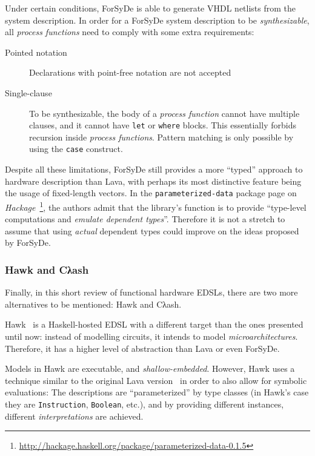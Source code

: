             Under certain conditions, ForSyDe is able to generate \ac{VHDL} netlists from the system description.
            In order for a ForSyDe system description to be \emph{synthesizable},
            all \emph{process functions} need to comply with some extra requirements:

            \begin{description}
                \item[Pointed notation] Declarations with point-free notation are not accepted
                \item[Single-clause] To be synthesizable,
                    the body of a \emph{process function} cannot have multiple clauses,
                    and it cannot have \texttt{let} or \texttt{where} blocks.
                    This essentially forbids recursion inside \emph{process functions}.
                    Pattern matching is only possible by using the \texttt{case} construct.
            \end{description}

            Despite all these limitations,
            ForSyDe still provides a more ``typed'' approach to hardware description than Lava,
            with perhaps its most distinctive feature being the usage of fixed-length vectors.
            In the \texttt{parameterized-data} package page
            on \emph{Hackage}~\footnote{\url{http://hackage.haskell.org/package/parameterized-data-0.1.5}},
            the authors admit that the library's function is to provide
            ``type-level computations and \emph{emulate dependent types}''.
            Therefore it is not a stretch to assume that using \emph{actual} dependent types
            could improve on the ideas proposed by ForSyDe.


            \subsubsection{Hawk and Cλash}
            Finally, in this short review of functional hardware \acp{EDSL},
            there are two more alternatives to be mentioned: Hawk and Cλash.

            Hawk~\cite{hawk-haskell} is a Haskell-hosted \ac{EDSL} with a different target than
            the ones presented until now: instead of modelling circuits, it intends to model \emph{microarchitectures}.
            Therefore, it has a higher level of abstraction than Lava or even ForSyDe.

            Models in Hawk are executable, and \emph{shallow-embedded}.
            However, Hawk uses a technique similar to the original Lava version~\cite{lava-1999}
            in order to also allow for symbolic evaluations:
            The descriptions are ``parameterized'' by type classes
            (in Hawk's case they are \texttt{Instruction}, \texttt{Boolean}, etc.),
            and by providing different instances, different \emph{interpretations} are achieved.

